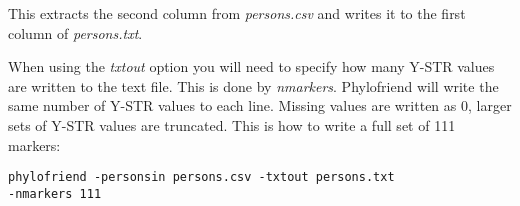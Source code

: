 This extracts the second column from \emph{persons.csv} and
writes it to the first column of \emph{persons.txt}.

When using the \emph{txtout} option you will need to specify
how many Y-STR values are written to the text file. This is
done by \emph{nmarkers}. Phylofriend will write the same number
of Y-STR values to each line. Missing values are written as
0, larger sets of Y-STR values are truncated. This is how to
write a full set of 111 markers:

\noindent\texttt{phylofriend -personsin persons.csv -txtout persons.txt\\
-nmarkers 111}
















